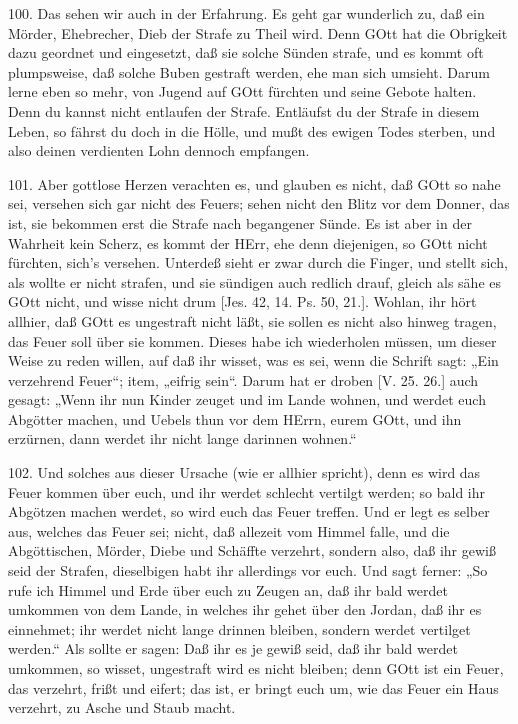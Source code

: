 100. Das sehen wir auch in der Erfahrung. Es geht gar wunderlich zu, daß ein Mörder, Ehebrecher, Dieb der Strafe zu Theil wird. Denn GOtt hat die Obrigkeit dazu geordnet und eingesetzt, daß sie solche Sünden strafe, und es kommt oft plumpsweise, daß solche Buben gestraft werden, ehe man sich umsieht. Darum lerne eben so mehr, von Jugend auf GOtt fürchten und seine Gebote halten. Denn du kannst nicht entlaufen der Strafe. Entläufst du der Strafe in diesem Leben, so fährst du doch in die Hölle, und mußt des ewigen Todes sterben, und also deinen verdienten Lohn dennoch empfangen.

101. Aber gottlose Herzen verachten es, und glauben es nicht, daß GOtt so nahe sei, versehen sich gar nicht des Feuers; sehen nicht den Blitz vor dem Donner, das ist, sie bekommen erst die Strafe nach begangener Sünde. Es ist aber in der Wahrheit kein Scherz, es kommt der HErr, ehe denn diejenigen, so GOtt nicht fürchten, sich’s versehen. Unterdeß sieht er zwar durch die Finger, und stellt sich, als wollte er nicht strafen, und sie sündigen auch redlich drauf, gleich als sähe es GOtt nicht, und wisse nicht
drum [Jes. 42, 14. Ps. 50, 21.]. Wohlan, ihr hört allhier, daß GOtt es ungestraft nicht läßt, sie sollen es nicht also hinweg tragen, das Feuer soll über sie kommen. Dieses habe ich wiederholen müssen, um dieser Weise zu reden willen, auf daß ihr wisset, was es sei, wenn die Schrift sagt: „Ein verzehrend Feuer“; item, „eifrig sein“. Darum hat er droben [V. 25. 26.] auch gesagt: „Wenn ihr nun Kinder zeuget und im Lande wohnen, und werdet euch Abgötter machen, und Uebels thun vor dem HErrn, eurem GOtt, und ihn erzürnen, dann werdet ihr nicht lange darinnen wohnen.“

102. Und solches aus dieser Ursache (wie er allhier spricht), denn es wird das Feuer kommen über euch, und ihr werdet schlecht vertilgt werden; so bald ihr Abgötzen machen werdet, so wird euch das Feuer treffen. Und er legt es selber aus, welches das Feuer sei; nicht, daß allezeit vom Himmel falle, und die Abgöttischen, Mörder, Diebe und Schäffte verzehrt, sondern also, daß ihr gewiß seid der Strafen, dieselbigen habt ihr allerdings vor euch. Und sagt ferner: „So rufe ich Himmel und Erde über euch zu Zeugen an, daß ihr bald werdet umkommen von dem Lande, in welches ihr gehet über den Jordan, daß ihr es einnehmet; ihr werdet nicht lange drinnen bleiben, sondern werdet vertilget werden.“ Als sollte er sagen: Daß ihr es je gewiß seid, daß ihr bald werdet umkommen, so wisset, ungestraft wird es nicht bleiben; denn GOtt ist ein Feuer, das verzehrt, frißt und eifert; das ist, er bringt euch um, wie das Feuer ein Haus verzehrt, zu Asche und Staub macht.

